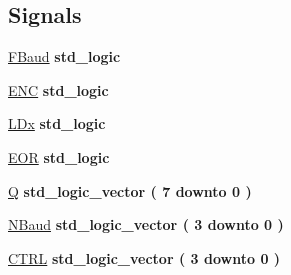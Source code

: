 \subsection*{Signals}
 \begin{DoxyCompactItemize}
\item 
\hyperlink{class_r_s232_read_1_1moore_a6124f56309031033b8f7a798ca30372d}{F\+Baud} {\bfseries \textcolor{comment}{std\+\_\+logic}\textcolor{vhdlchar}{ }} 
\item 
\hyperlink{class_r_s232_read_1_1moore_a861594f144c269f2d56bc9e488e023ef}{E\+N\+C} {\bfseries \textcolor{comment}{std\+\_\+logic}\textcolor{vhdlchar}{ }} 
\item 
\hyperlink{class_r_s232_read_1_1moore_a6e558f552744961fe10b8d8f6655c0fa}{L\+Dx} {\bfseries \textcolor{comment}{std\+\_\+logic}\textcolor{vhdlchar}{ }} 
\item 
\hyperlink{class_r_s232_read_1_1moore_a219df686323b31c9b52c306d4e497cd5}{E\+O\+R} {\bfseries \textcolor{comment}{std\+\_\+logic}\textcolor{vhdlchar}{ }} 
\item 
\hyperlink{class_r_s232_read_1_1moore_a6458136b285a8d23fcb9359308642e11}{Q} {\bfseries \textcolor{comment}{std\+\_\+logic\+\_\+vector}\textcolor{vhdlchar}{ }\textcolor{vhdlchar}{(}\textcolor{vhdlchar}{ }\textcolor{vhdlchar}{ } \textcolor{vhdldigit}{7} \textcolor{vhdlchar}{ }\textcolor{keywordflow}{downto}\textcolor{vhdlchar}{ }\textcolor{vhdlchar}{ } \textcolor{vhdldigit}{0} \textcolor{vhdlchar}{ }\textcolor{vhdlchar}{)}\textcolor{vhdlchar}{ }} 
\item 
\hyperlink{class_r_s232_read_1_1moore_a772e393b5bc102d160a760efebdcbc14}{N\+Baud} {\bfseries \textcolor{comment}{std\+\_\+logic\+\_\+vector}\textcolor{vhdlchar}{ }\textcolor{vhdlchar}{(}\textcolor{vhdlchar}{ }\textcolor{vhdlchar}{ } \textcolor{vhdldigit}{3} \textcolor{vhdlchar}{ }\textcolor{keywordflow}{downto}\textcolor{vhdlchar}{ }\textcolor{vhdlchar}{ } \textcolor{vhdldigit}{0} \textcolor{vhdlchar}{ }\textcolor{vhdlchar}{)}\textcolor{vhdlchar}{ }} 
\item 
\hyperlink{class_r_s232_read_1_1moore_a3d8b83829d56d20a227b6507d3631397}{C\+T\+R\+L} {\bfseries \textcolor{comment}{std\+\_\+logic\+\_\+vector}\textcolor{vhdlchar}{ }\textcolor{vhdlchar}{(}\textcolor{vhdlchar}{ }\textcolor{vhdlchar}{ } \textcolor{vhdldigit}{3} \textcolor{vhdlchar}{ }\textcolor{keywordflow}{downto}\textcolor{vhdlchar}{ }\textcolor{vhdlchar}{ } \textcolor{vhdldigit}{0} \textcolor{vhdlchar}{ }\textcolor{vhdlchar}{)}\textcolor{vhdlchar}{ }} 
\end{DoxyCompactItemize}
